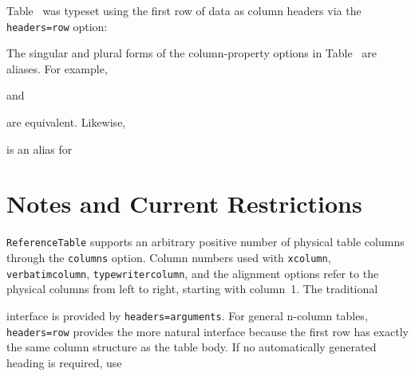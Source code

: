 \documentclass[
11pt,
a4paper,
oneside
]{scrbook}
\begin{document}
%
 

\noindent Table~ was typeset using the first row of data as column headers via the \texttt{headers=row} option:
\vspace{2ex}
\begin{HalfArea}




\end{HalfArea}
The singular and plural forms of the column-property options in
Table~ are aliases.
For example,




and




are equivalent.
Likewise,




is an alias for





\section{Notes and Current Restrictions}

\texttt{ReferenceTable} supports an arbitrary positive number of physical
table columns through the \texttt{columns} option.
Column numbers used with \texttt{xcolumn}, \texttt{verbatimcolumn},
\texttt{typewritercolumn}, and the alignment options refer to the physical
columns from left to right, starting with column~1.
The traditional




interface is provided by \texttt{headers=arguments}. For general n-column
tables, \texttt{headers=row} provides the more natural interface because the
first row has exactly the same column structure as the table body.
If no automatically generated heading is required, use
\end{document}
